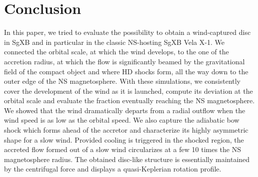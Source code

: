 \documentclass{aa}
\makeatletter
\newcommand{\sgx}{SgXB\xspace}
\newcommand*{\ns}{NS\@\xspace}
\makeatother
\begin{document}
%
%

\section{Conclusion}
\label{sec:conc}

In this paper, we tried to evaluate the possibility to obtain a wind-captured disc in \sgx and in particular in the classic \ns -hosting \sgx Vela X-1. We connected the orbital scale, at which the wind develops, to the one of the accretion radius, at which the flow is significantly beamed by the gravitational field of the compact object and where HD shocks form, all the way down to the outer edge of the \ns magnetosphere. With these simulations, we consistently cover the development of the wind as it is launched, compute its deviation at the orbital scale and evaluate the fraction eventually reaching the \ns magnetosphere. We showed that the wind dramatically departs from a radial outflow when the wind speed is as low as the orbital speed. We also capture the adiabatic bow shock which forms ahead of the accretor and characterize its highly asymmetric shape for a slow wind. Provided cooling is triggered in the shocked region, the accreted flow formed out of a slow wind circularizes at a few 10 times the \ns magnetosphere radius. The obtained disc-like structure is essentially maintained by the centrifugal force and displays a quasi-Keplerian rotation profile.
\end{document}
